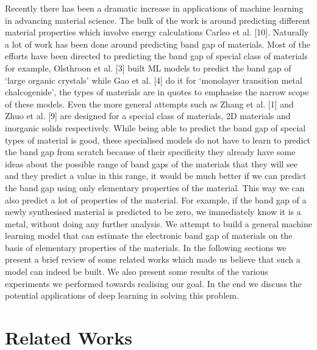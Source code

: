 \documentclass{article}
\begin{document}
Recently there has been a dramatic increase in applications of machine learning in advancing material science. The bulk of the work is around predicting different material properties which involve energy calculations Carleo et al. [10]. Naturally a lot of work has been done around predicting band gap of materials. Most of the efforts have been directed to predicting the band gap of special class of materials for example, Olsthroon et al. [3] built ML models to predict the band gap of `large organic crystals' while Gao et al. [4] do it for `monolayer transition metal chalcogenide', the types of materials are in quotes to emphasise the narrow scope of these models. Even the more general attempts such as Zhang et al. [1] and Zhuo et al. [9] are designed for a special class of materials, 2D materials and inorganic solids respectively. While being able to predict the band gap of special types of material is good, these specialised models do not have to learn to predict the band gap from scratch because of their specificity they already have some ideas about the possible range of band gaps of the materials that they will see and they predict a value in this range, it would be much better if we can predict the band gap using only elementary properties of the material. This way we can also predict a lot of properties of the material. For example, if the band gap of a newly synthesised material is predicted to be zero, we immediately know it is a metal, without doing any further analysis. We attempt to build a general machine learning model that can estimate the electronic band gap of materials on the basis of elementary properties of the materials. In the following sections we present a brief review of some related works which made us believe that such a model can indeed be built. We also present some results of the various experiments we performed towards realising our goal. In the end we discuss the potential applications of deep learning in solving this problem.

\section{Related Works}
\end{document}
